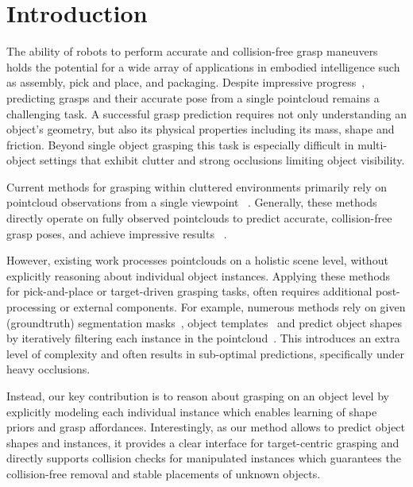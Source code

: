 \documentclass[letterpaper, 10 pt, conference]{ieeeconf}  %
\begin{document}
\section{Introduction}
\label{sec:introduction}
The ability of robots to perform accurate and collision-free grasp maneuvers holds the potential for a wide array of applications in embodied intelligence\cite{embodied:intell:2015} such as assembly, pick and place, and packaging.
%
Despite impressive progress~\cite{mahler2017dex,Gualtieri2016HighPG,Breyer2021VolumetricGN,Sundermeyer2021ContactGraspNetE6,huang2022edge},
predicting grasps and their accurate pose from a single pointcloud remains a challenging task.
A successful grasp prediction requires not only understanding an object's geometry, but also its physical properties including its mass, shape and friction.
Beyond single object grasping this task is especially difficult in multi-object settings that exhibit clutter and strong occlusions limiting object visibility.

Current methods for grasping within cluttered environments primarily rely on pointcloud observations from a single viewpoint ~\cite{van2020learning,Jiang2021SynergiesBA, Mousavian_2019_ICCV, Breyer2021VolumetricGN,Sundermeyer2021ContactGraspNetE6, huang2022edge}. 
Generally, these methods directly operate on fully observed pointclouds to predict accurate, collision-free grasp poses, and achieve impressive results ~\cite{huang2022edge}.

However, existing work processes pointclouds on a holistic scene level, without explicitly reasoning about individual object instances. 
Applying these methods for pick-and-place or target-driven grasping tasks, often requires additional post-processing or external components.
For example, numerous methods rely on given (groundtruth) segmentation masks~\cite{ChavanDafle2021SimultaneousOR, li2021simultaneous,murali20206,yang2020deep}, object templates~\cite{danielczuk2019mechanical,lou2021collision} and predict object shapes by iteratively filtering each instance in the pointcloud~\cite{ChavanDafle2021SimultaneousOR}.
This introduces an extra level of complexity and often results in sub-optimal predictions, specifically under heavy occlusions.

Instead, our key contribution is to reason about grasping on an object level by explicitly modeling each individual instance which enables learning of shape priors and grasp affordances.
Interestingly, as our method allows to predict object shapes and instances,
it provides a clear interface for target-centric grasping
and directly supports collision checks for manipulated instances
which guarantees the collision-free removal and stable placements of unknown objects.
\end{document}
